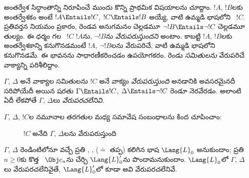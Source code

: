 \documentclass[../../../include/open-logic-section]{subfiles}
\begin{document}


అంతర్వేశ సిద్ధాంతాన్ని నిరూపించే ముందు కొన్ని ప్రాథమిక విషయాలను చూద్దాం.
$!A$, $!B$లకు అంతర్వేశకం అంటే $!A \Entails !C$, $!C \Entails !B$
అయ్యే, వాటి ఉమ్మడి భాషలోని ~$!C$. ప్రతివర్తన నియమం
ప్రకారం, రెండవ అనుగమనం చెల్లడమూ $\lnot !B \Entails \lnot !C$ చెల్లడమూ
తుల్యం. ఈ ధర్మం గల ~$!C$
$!A$ను, $\lnot !B$ను \emph{వేరుపరుస్తుందని} అంటాం. కాబట్టి
$!A$, $!B$లకు అంతర్వేశకాన్ని కనుగొనడమంటే $!A$, $\lnot !B$లను
వేరుపరిచే, వాటి ఉమ్మడి భాషలోని  కనుగొనడమే. ఈ భావనను సాధారణీకరించడం ఉపయోగకరం. రెండు
\emph{ సమితులను}
వేరుపరిచే వాక్యాన్ని పరిశీలిద్దాం.

\begin{defn}
$\Gamma$, $\Delta$ అనే వాక్యాల సమితులను $!C$ అనే వాక్యం
\emph{వేరుపరుస్తుంది} అనడానికి అవసరమైనదీ సరిపోయేదీ అయిన షరతు
$\Gamma \Entails !C$, $\Delta \Entails \lnot !C$ రెండూ నెరవేరడం. అలాంటి 
ఏదీ లేకపోతే $\Gamma$, $\Delta$లు \emph{వేరుపరచలేనివి}.
\end{defn}

$\Gamma$, $\Delta$, $!C$ల నమూనాల తరగతుల మధ్య సమావేష సంబంధాలను
కింద చూపించాం:
\begin{figure}[h]
  \centering
  \caption{$!C$ అనేది $\Gamma$, $\Delta$లను వేరుపరుస్తుంది}
\end{figure}

\begin{lem}
$\Gamma$, $\Delta$ రెండింటిలోనూ వచ్చే ప్రతి
,
,
 ($\doteq$ తప్ప) కలిగిన భాష
$\Lang{L}_0$ అనుకుందాం; ప్రతి $n \ge 0$కు కొత్త
~$\Obj c_n$ను చేర్చి
$\Lang{L}'_0$ను పొందామనుకుందాం. $\Lang{L}_0$లో $\Gamma$, $\Delta$లు
వేరుపరచలేనివైతే, $\Lang{L}'_0$లో కూడా అవి వేరుపరచలేనివే.
\end{lem}
\end{document}
